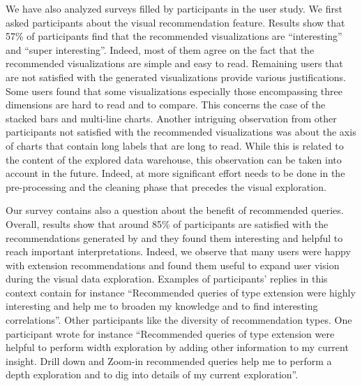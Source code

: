  We have also analyzed surveys filled by participants in the user study. We first asked participants about the visual recommendation feature. Results show that 57\% of participants find that the recommended visualizations are ``interesting'' and ``super interesting''. Indeed, most of them agree on the fact that the recommended visualizations are simple and easy to read.
Remaining users that are not satisfied with the generated visualizations provide various justifications. Some users found that some visualizations especially those encompassing three dimensions are hard to read and to compare. This concerns the case of the stacked bars and multi-line charts. Another intriguing observation from other participants not satisfied with the recommended visualizations was about the axis of charts that contain long labels that are long to read. While this is related to the content of the explored data warehouse, this observation can be taken into account in the future. 
{\color{Fuchsia}Indeed, at more significant effort needs to be done in the pre-processing and the cleaning phase that precedes the visual exploration.}

Our survey contains also a question about the benefit of recommended queries. Overall, results show that around 85\% of participants are satisfied with the recommendations generated by \prototype{} and they found them interesting and helpful to reach important interpretations.
Indeed, we observe that many users were happy with extension recommendations and found them useful to expand user vision during the visual data exploration.  Examples of participants' replies in this context contain for instance ``Recommended queries of type extension were highly interesting and help me to broaden my knowledge and to find interesting correlations''. Other participants like the diversity of recommendation types. One participant wrote for instance ``Recommended queries of type extension were helpful to perform width exploration by adding other information to my current insight. Drill down and Zoom-in recommended queries help me to perform a depth exploration and to dig into details of my current exploration''.

